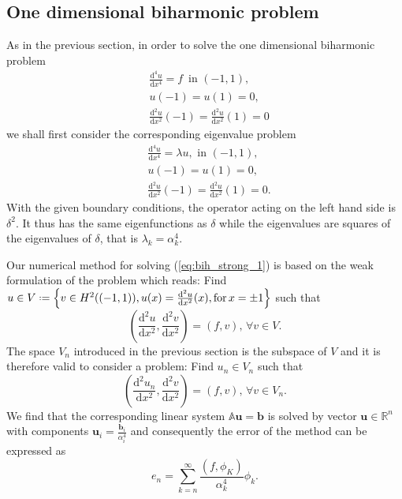 \documentclass[a4paper,10pt]{article}
\newcommand{\R}{\ensuremath{\mathbb{R}}}
\newcommand{\inner}[2]{\ensuremath{\left(#1, #2\right)}}
\newcommand{\deriv}[2]{\ensuremath{\frac{\mathrm{d}#1}{\mathrm{d}#2}}}
\newcommand*{\defeq}{\mathrel{\vcenter{\baselineskip0.5ex \lineskiplimit0pt
                     \hbox{\scriptsize.}\hbox{\scriptsize.}}}%
                     =}
\begin{document}
  \subsection{One dimensional biharmonic problem}
  As in the previous section, in order to solve the one dimensional biharmonic
  problem
  \begin{equation}
  \label{eq:bih_strong_1}
  \begin{aligned}
    &\deriv{^4u}{x^4} = f\,\text{ in }(-1, 1),\\
    &u(-1) = u(1) = 0,\\
    &\deriv{^2u}{x^2}(-1) = \deriv{^2u}{x^2}(1) = 0
  \end{aligned}
  \end{equation}
  we shall first consider the corresponding eigenvalue problem
  \begin{equation}
  \begin{aligned}
    &\deriv{^4u}{x^4} = \lambda u,\text{ in }(-1, 1),\\
    &u(-1) = u(1) = 0,\\
    &\deriv{^2u}{x^2}(-1) = \deriv{^2u}{x^2}(1) = 0.
  \end{aligned}
  \end{equation}
  With the given boundary conditions, the operator acting on the left hand
  side is $\delta^2$. It thus has the same eigenfunctions as $\delta$ while
  the eigenvalues are squares of the eigenvalues of $\delta$, that is
  $\lambda_k=\alpha_k^4$.
  
  Our numerical method for solving (\ref{eq:bih_strong_1}) is based on the 
  weak formulation of the problem which reads: Find $u\in V\defeq\left\{v\in
  H^2((-1, 1)), u(x)=\deriv{^2u}{x^2}(x),\text{for}\,x=\pm 1\right\}$ such that
  \[
    \inner{\deriv{^2u}{x^2}}{\deriv{^2v}{x^2}} = \inner{f}{v},\,\forall v\in V.
  \]
  The space $V_n$ introduced in the previous section is the subspace of $V$
  and it is therefore valid to consider a problem: Find $u_n\in V_n$ such that
  \begin{equation}
    \label{eq:bih_weak_1}
    \inner{\deriv{^2u_n}{x^2}}{\deriv{^2v}{x^2}} = \inner{f}{v},\,\forall v\in V_n.
  \end{equation}
  We find that the corresponding linear system $\mathbb{A}\mathbf{u}=\mathbf{b}$
  is solved by vector $\mathbf{u}\in\R^n$ with components
  $\mathbf{u}_i=\frac{\mathbf{b}_i}{\alpha_i^4}$ and consequently the error of the
  method can be expressed as
  \[
    e_n = \sum_{k=n}^{\infty} \frac{\inner{f}{\phi_K}}{\alpha_k^4} \phi_k.
  \]
\end{document}
